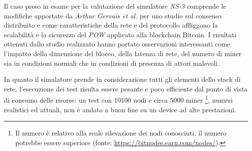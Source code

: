 Il caso preso in esame per la valutazione del simulatore \textit{NS-3} comprende le modifiche apportate da \textit{Arthur Gervais et al.} per uno studio sul consenso distribuito e come caratteristiche della rete e del protocollo affliggono la scalabilità e la sicurezza del \textit{POW} applicato alla blockchain Bitcoin.\newline
I risultati ottenuti dallo studio realizzato hanno portato osservazioni interessanti come l'impatto della dimensione del blocco, della latenza di rete, del numero di miner sia in condizioni normali che in condizioni di presenza di attori malevoli.
\begin{table}
    \centering
    \caption{Numero di blocchi \textit{stale} e transazioni per secondo raggiungibili con 16 miner nella rete e diverse dimensioni dei blocchi}
\end{table}
In quanto il simulatore prende in considerazione tutti gli elementi dello stack di rete, l'esecuzione dei test risulta essere pesante e poco efficiente dal punto di vista di consumo delle risorse: un test con $10100$ nodi e circa $5000$ miner \footnote{Il numero è relativo alla reale rilevazione dei nodi conosciuti, il numero potrebbe essere superiore (fonte: \href{https://bitnodes.earn.com/nodes/}{https://bitnodes.earn.com/nodes/}).}, numeri realistici ed attuali, non è andato a buon fine su un device ad alte prestazioni.\newline

